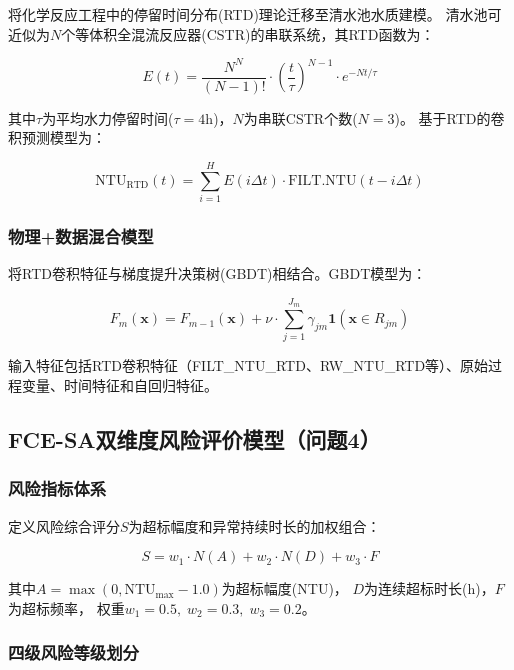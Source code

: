 \documentclass[12pt,a4paper]{ctexart}
\begin{document}
将化学反应工程中的停留时间分布(RTD)理论\cite{ref6}迁移至清水池水质建模。
清水池可近似为$N$个等体积全混流反应器(CSTR)的串联系统，其RTD函数为：

\begin{equation}\label{eq:rtd}
E(t) = \frac{N^N}{(N-1)!} \cdot \left(\frac{t}{\tau}\right)^{N-1} \cdot e^{-Nt/\tau}
\end{equation}

其中$\tau$为平均水力停留时间($\tau=4$h)，$N$为串联CSTR个数($N=3$)。
基于RTD的卷积预测模型为：

\begin{equation}\label{eq:rtd_conv}
\mathrm{NTU}_{\mathrm{RTD}}(t) = \sum_{i=1}^{H} E(i\Delta t) \cdot \mathrm{FILT.NTU}(t - i\Delta t)
\end{equation}

\subsubsection{物理+数据混合模型}

将RTD卷积特征与梯度提升决策树(GBDT)\cite{ref7}相结合。GBDT模型为：

\begin{equation}\label{eq:gbdt}
F_m(\mathbf{x}) = F_{m-1}(\mathbf{x}) + \nu \cdot \sum_{j=1}^{J_m} \gamma_{jm} \mathbf{1}(\mathbf{x} \in R_{jm})
\end{equation}

输入特征包括RTD卷积特征（FILT\_NTU\_RTD、RW\_NTU\_RTD等）、原始过程变量、时间特征和自回归特征。

\subsection{FCE-SA双维度风险评价模型（问题4）}

\subsubsection{风险指标体系}

定义风险综合评分$S$为超标幅度和异常持续时长的加权组合\cite{ref8}：

\begin{equation}\label{eq:risk}
S = w_1 \cdot N(A) + w_2 \cdot N(D) + w_3 \cdot F
\end{equation}

其中$A = \max(0, \mathrm{NTU}_{\max} - 1.0)$为超标幅度(NTU)，
$D$为连续超标时长(h)，$F$为超标频率，
权重$w_1=0.5,\; w_2=0.3,\; w_3=0.2$。

\subsubsection{四级风险等级划分}
\end{document}
